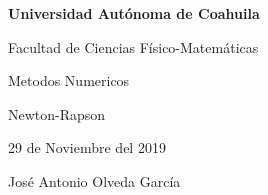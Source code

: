 \documentclass{article}
\begin{document}
\begin{center}
{\Large \textbf{Universidad Autónoma de Coahuila}}
\end{center}

\begin{center}
{\large Facultad de Ciencias Físico-Matemáticas}
\end{center}

\begin{center}
{\large Metodos Numericos}
\end{center}

\begin{center}
{\large Newton-Rapson}
\end{center}

\begin{center}
{\large 29 de Noviembre del 2019}
\end{center}

\begin{center}
{\large José Antonio Olveda García}
\end{center}

\vspace{5mm}
\end{document}

